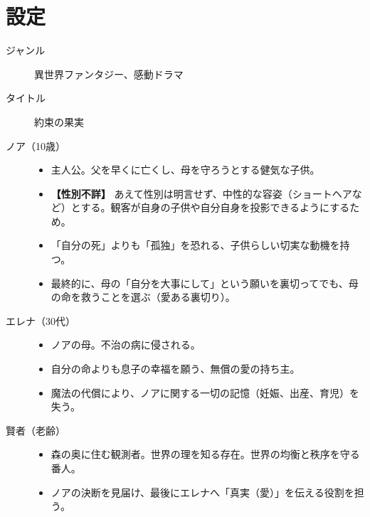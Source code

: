 \clearpage\section{設定}
\begin{description}
    \item [ジャンル] 異世界ファンタジー、感動ドラマ
    \item [タイトル] 約束の果実
    \item [ノア（10歳）]
    \begin{itemize}
        \item 主人公。父を早くに亡くし、母を守ろうとする健気な子供。
        \item \textbf{【性別不詳】} あえて性別は明言せず、中性的な容姿（ショートヘアなど）とする。観客が自身の子供や自分自身を投影できるようにするため。
        \item 「自分の死」よりも「孤独」を恐れる、子供らしい切実な動機を持つ。
        \item 最終的に、母の「自分を大事にして」という願いを裏切ってでも、母の命を救うことを選ぶ（愛ある裏切り）。
    \end{itemize}
    \item [エレナ（30代）]
    \begin{itemize}
        \item ノアの母。不治の病に侵される。
        \item 自分の命よりも息子の幸福を願う、無償の愛の持ち主。
        \item 魔法の代償により、ノアに関する一切の記憶（妊娠、出産、育児）を失う。
    \end{itemize}
    \item [賢者（老齢）]
    \begin{itemize}
        \item 森の奥に住む観測者。世界の理を知る存在。世界の均衡と秩序を守る番人。
        \item ノアの決断を見届け、最後にエレナへ「真実（愛）」を伝える役割を担う。
    \end{itemize}


\end{description}
